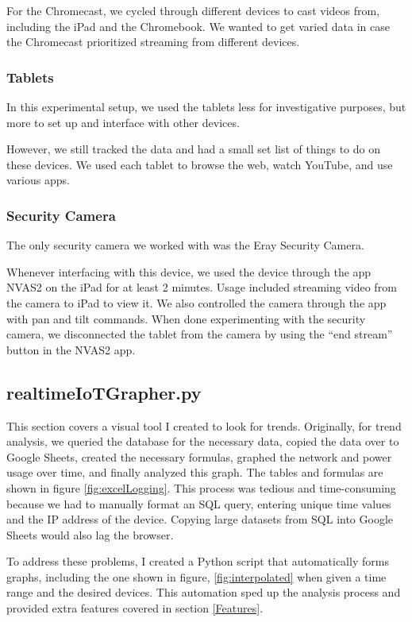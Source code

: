 For the Chromecast, we cycled through different devices to cast videos from, including the iPad and the Chromebook. We wanted to get varied data in case the Chromecast prioritized streaming from different devices.

\subsubsection{Tablets}
In this experimental setup, we used the tablets less for investigative purposes, but more to set up and interface with other devices.

However, we still tracked the data and had a small set list of things to do on these devices. We used each tablet to browse the web, watch YouTube, and use various apps.

\subsubsection{Security Camera}

The only security camera we worked with was the Eray Security Camera.

Whenever interfacing with this device, we used the device through the app NVAS2 \cite{nvas2} on the iPad for at least 2 minutes. Usage included streaming video from the camera to iPad to view it. We also controlled the camera through the app with pan and tilt commands. When done experimenting with the security camera, we disconnected the tablet from the camera by using the ``end stream'' button in the NVAS2 app.

\subsection{realtimeIoTGrapher.py}
\label{realtimeIoTGrapher.py}

This section covers a visual tool I created to look for trends. Originally, for trend analysis, we queried the database for the necessary data, copied the data over to Google Sheets, created the necessary formulas, graphed the network and power usage over time, and finally analyzed this graph. The tables and formulas are shown in figure \ref{fig:excelLogging}. This process was tedious and time-consuming because we had to manually format an SQL query, entering unique time values and the IP address of the device. Copying large datasets from SQL into Google Sheets would also lag the browser.

To address these problems, I created a Python script that automatically forms graphs, including the one shown in figure, \ref{fig:interpolated} when given a time range and the desired devices. This automation sped up the analysis process and provided extra features covered in section \ref{Features}.

